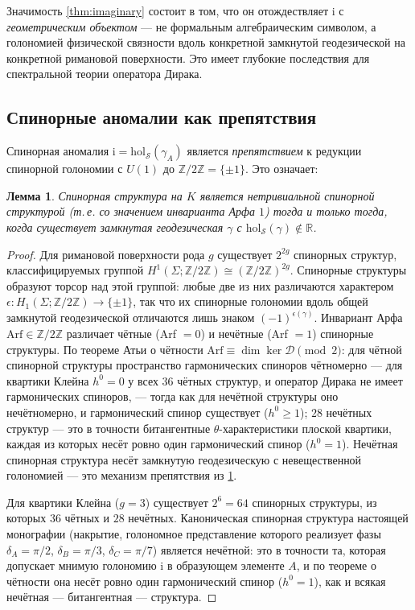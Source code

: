 \documentclass[12pt,a4paper]{article}
\newtheorem{lemma}[theorem]{Лемма}
\theoremstyle{definition}
\theoremstyle{remark}
\newcommand{\RR}{\mathbb{R}}
\newcommand{\ZZ}{\mathbb{Z}}
\newcommand{\hol}{\mathrm{hol}}
\newcommand{\cD}{\mathcal{D}}
\newcommand{\cS}{\mathcal{S}}
\newcommand{\ii}{\mathrm{i}}
\begin{document}
Значимость \cref{thm:imaginary} состоит в том, что он отождествляет $\ii$ с \emph{геометрическим объектом} --- не формальным алгебраическим символом, а голономией физической связности вдоль конкретной замкнутой геодезической на конкретной римановой поверхности. Это имеет глубокие последствия для спектральной теории оператора Дирака.

\subsection{Спинорные аномалии как препятствия}

Спинорная аномалия $\ii = \hol_{\cS}(\gamma_A)$ является \emph{препятствием} к редукции спинорной голономии с $U(1)$ до $\ZZ/2\ZZ = \{\pm 1\}$. Это означает:

\begin{lemma}
\label{lem:obstruction}
Спинорная структура на $K$ является \emph{нетривиальной} спинорной структурой (т.\,е. со значением инварианта Арфа $1$) тогда и только тогда, когда существует замкнутая геодезическая $\gamma$ с $\hol_{\cS}(\gamma) \notin \RR$.
\end{lemma}

\begin{proof}
Для римановой поверхности рода $g$ существует $2^{2g}$ спинорных структур, классифицируемых группой $H^1(\Sigma; \ZZ/2\ZZ) \cong (\ZZ/2\ZZ)^{2g}$. Спинорные структуры образуют торсор над этой группой: любые две из них различаются характером $\epsilon \colon H_1(\Sigma; \ZZ/2\ZZ) \to \{\pm 1\}$, так что их спинорные голономии вдоль общей замкнутой геодезической отличаются лишь знаком $(-1)^{\epsilon(\gamma)}$. Инвариант Арфа $\mathrm{Arf} \in \ZZ/2\ZZ$ различает чётные (Arf $= 0$) и нечётные (Arf $= 1$) спинорные структуры. По теореме Атьи о чётности $\mathrm{Arf} \equiv \dim \ker \cD \pmod{2}$: для чётной спинорной структуры пространство гармонических спиноров чётномерно --- для квартики Клейна $h^0 = 0$ у всех $36$ чётных структур, и оператор Дирака не имеет гармонических спиноров, --- тогда как для нечётной структуры оно нечётномерно, и гармонический спинор существует ($h^0 \geq 1$); $28$ нечётных структур --- это в точности битангентные $\theta$-характеристики плоской квартики, каждая из которых несёт ровно один гармонический спинор ($h^0 = 1$). Нечётная спинорная структура несёт замкнутую геодезическую с невещественной голономией --- это механизм препятствия из \cref{lem:obstruction}.

Для квартики Клейна ($g = 3$) существует $2^6 = 64$ спинорных структуры, из которых $36$ чётных и $28$ нечётных. Каноническая спинорная структура настоящей монографии (накрытие, голономное представление которого реализует фазы $\delta_A = \pi/2$, $\delta_B = \pi/3$, $\delta_C = \pi/7$) является нечётной: это в точности та, которая допускает мнимую голономию $\ii$ в образующем элементе $A$, и по теореме о чётности она несёт ровно один гармонический спинор ($h^0 = 1$), как и всякая нечётная --- битангентная --- структура.
\end{proof}
\end{document}
